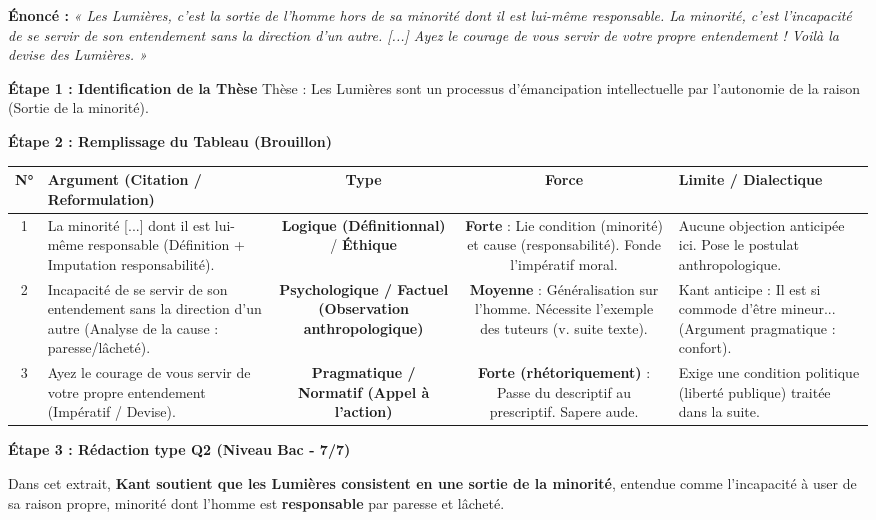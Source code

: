 \documentclass[11pt]{article}
\newcommand{\cle}[1]{{\popxbold\color{popdark}#1}}
\begin{document}
\begin{exoresolu}
\textbf{Énoncé :} \textit{« Les Lumières, c'est la sortie de l'homme hors de sa minorité dont il est lui-même responsable. La minorité, c'est l'incapacité de se servir de son entendement sans la direction d'un autre. [...] Ayez le courage de vous servir de votre propre entendement ! Voilà la devise des Lumières. »}

\textbf{Étape 1 : Identification de la Thèse}
\cle{Thèse} : Les Lumières sont un processus d'émancipation intellectuelle par l'autonomie de la raison (\og{}Sortie de la minorité\fg{}).

\textbf{Étape 2 : Remplissage du Tableau (Brouillon)}

\begin{center}
\begin{tabularx}{\linewidth}{|c|X|c|c|X|}\hline
\textbf{N°} & \textbf{Argument (Citation / Reformulation)} & \textbf{Type} & \textbf{Force} & \textbf{Limite / Dialectique} \\ \hline
1 & \og{}La minorité [...] dont il est lui-même responsable\fg{} (Définition + Imputation responsabilité). & \textbf{Logique (Définitionnal)} / \textbf{Éthique} & \textbf{Forte} : Lie condition (minorité) et cause (responsabilité). Fonde l'impératif moral. & Aucune objection anticipée ici. Pose le postulat anthropologique. \\ \hline
2 & \og{}Incapacité de se servir de son entendement sans la direction d'un autre\fg{} (Analyse de la cause : paresse/lâcheté). & \textbf{Psychologique / Factuel (Observation anthropologique)} & \textbf{Moyenne} : Généralisation sur \og{}l'homme\fg{}. Nécessite l'exemple des \og{}tuteurs\fg{} (v. suite texte). & Kant anticipe : \og{}Il est si commode d'être mineur...\fg{} (Argument pragmatique : confort). \\ \hline
3 & \og{}Ayez le courage de vous servir de votre propre entendement\fg{} (Impératif / Devise). & \textbf{Pragmatique / Normatif (Appel à l'action)} & \textbf{Forte (rhétoriquement)} : Passe du descriptif au prescriptif. \og{}Sapere aude\fg{}. & Exige une condition politique (liberté publique) traitée dans la suite. \\ \hline
\end{tabularx}
\end{center}

\textbf{Étape 3 : Rédaction type Q2 (Niveau Bac - 7/7)}

\og{}Dans cet extrait, \textbf{Kant soutient que les Lumières consistent en une sortie de la minorité}, entendue comme l'incapacité à user de sa raison propre, minorité dont l'homme est \textbf{responsable} par paresse et lâcheté.


\end{exoresolu}
\end{document}
